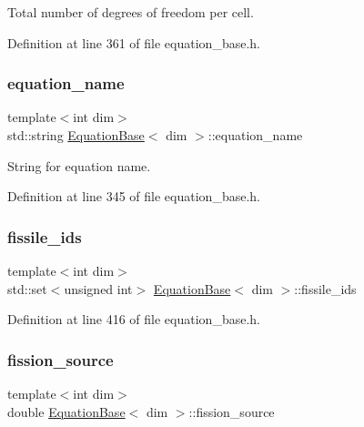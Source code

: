 Total number of degrees of freedom per cell. 



Definition at line 361 of file equation\+\_\+base.\+h.

\mbox{\label{class_equation_base_a0a72472959e531f5256400dec911f3a5}} 
\subsubsection{\texorpdfstring{equation\+\_\+name}{equation\_name}}
{\footnotesize\ttfamily template$<$int dim$>$ \\
std\+::string \hyperlink{class_equation_base}{Equation\+Base}$<$ dim $>$\+::equation\+\_\+name\hspace{0.3cm}{\ttfamily [protected]}}



String for equation name. 



Definition at line 345 of file equation\+\_\+base.\+h.

\mbox{\label{class_equation_base_aafa902bf78cf78770557098fa9027188}} 
\subsubsection{\texorpdfstring{fissile\+\_\+ids}{fissile\_ids}}
{\footnotesize\ttfamily template$<$int dim$>$ \\
std\+::set$<$unsigned int$>$ \hyperlink{class_equation_base}{Equation\+Base}$<$ dim $>$\+::fissile\+\_\+ids\hspace{0.3cm}{\ttfamily [protected]}}



Definition at line 416 of file equation\+\_\+base.\+h.

\mbox{\label{class_equation_base_aec6881c5aa66a28deab370236219f569}} 
\subsubsection{\texorpdfstring{fission\+\_\+source}{fission\_source}}
{\footnotesize\ttfamily template$<$int dim$>$ \\
double \hyperlink{class_equation_base}{Equation\+Base}$<$ dim $>$\+::fission\+\_\+source\hspace{0.3cm}{\ttfamily [protected]}}



